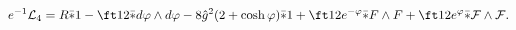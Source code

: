 \begin{equation}
e^{-1}{\cal L}_4 = R\bar *1-\ft12\bar*d\varphi\wedge d\varphi
-8\hat g^2(2+\cosh\varphi)\bar*1
+\ft12e^{-\varphi}\bar*F\wedge F +\ft12e^{\varphi}\bar*{\cal F}\wedge
{\cal F}.
\label{eq:d4n2lag2}
\end{equation}

